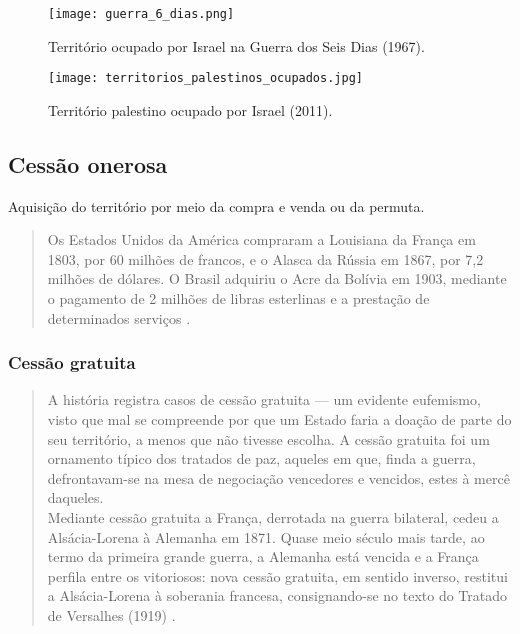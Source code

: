 \documentclass{article}
\begin{document}
\begin{figure}
    \centering
    \texttt{[image: guerra\_6\_dias.png]}
    \caption{Território ocupado por Israel na Guerra dos Seis Dias (1967).}
    \label{fig:guerra_6_dias}
\end{figure}

\begin{figure}
    \centering
    \texttt{[image: territorios\_palestinos\_ocupados.jpg]}
    \caption{Território palestino ocupado por Israel (2011).}
    \label{fig:territorios_palestinos_ocupados}
\end{figure}

\subsection{Cessão onerosa}

Aquisição do território por meio da compra e venda ou da permuta.

\begin{quote}
    Os Estados Unidos da América compraram a Louisiana da França em 1803, por 60 milhões de francos, e o Alasca da Rússia em 1867, por 7,2 milhões de dólares. O Brasil adquiriu o Acre da Bolívia em 1903, mediante o pagamento de 2 milhões de libras esterlinas e a prestação de determinados serviços \cite[p.~73]{rezek_direito_2024}.
\end{quote}

\subsubsection{Cessão gratuita}

\begin{quote}
    A história registra casos de cessão gratuita — um evidente eufemismo, visto que mal se compreende por que um Estado faria a doação de parte do seu território, a menos que não tivesse escolha. A cessão gratuita foi um ornamento típico dos tratados de paz, aqueles em que, finda a guerra, defrontavam-se na mesa de negociação vencedores e vencidos, estes à mercê daqueles.
    \\Mediante cessão gratuita a França, derrotada na guerra bilateral, cedeu a Alsácia-Lorena à Alemanha em 1871. Quase meio século mais tarde, ao termo da primeira grande guerra, a Alemanha está vencida e a França perfila entre os vitoriosos: nova cessão gratuita, em sentido inverso, restitui a Alsácia-Lorena à soberania francesa, consignando-se no texto do Tratado de Versalhes (1919) \cite[p.~73]{rezek_direito_2024}.
\end{quote}
\end{document}
